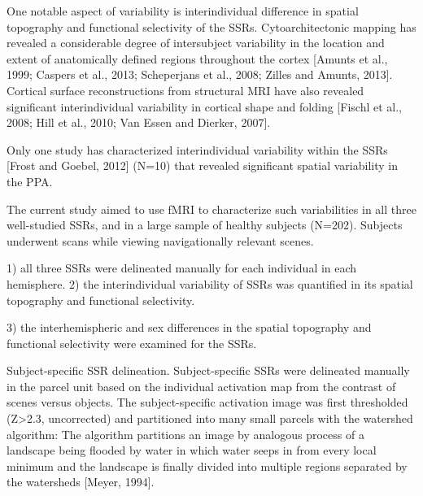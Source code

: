 %
One notable aspect of variability is interindividual difference in spatial
topography and functional selectivity of the SSRs.
%
Cytoarchitectonic mapping has revealed a considerable degree of intersubject
variability in the location and extent of anatomically defined regions
throughout the cortex [Amunts et al., 1999; Caspers et al., 2013; Scheperjans et
al., 2008; Zilles and Amunts, 2013].
%
Cortical surface reconstructions from structural MRI have also revealed
significant interindividual variability in cortical shape and folding [Fischl et
al., 2008; Hill et al., 2010; Van Essen and Dierker, 2007].

%
Only one study has characterized interindividual variability within the SSRs
[Frost and Goebel, 2012] (N=10) that revealed significant spatial variability in
the PPA.

The current study aimed to use fMRI to characterize such variabilities in all
three well-studied SSRs, and in a large sample of healthy subjects (N=202).
%
Subjects underwent scans while viewing navigationally relevant scenes.

%
1) all three SSRs were delineated manually for each individual in each
hemisphere.
%
2) the interindividual variability of SSRs was quantified in its spatial
topography and functional selectivity.

3) the interhemispheric and sex differences in the spatial topography and
functional selectivity were examined for the SSRs.

Subject-specific SSR delineation.
%
Subject-specific SSRs were delineated manually in the parcel unit based on the
individual activation map from the contrast of scenes versus objects.
%
The subject-specific activation image was first thresholded (Z>2.3, uncorrected)
and partitioned into many small parcels with the watershed algorithm:
%
The algorithm partitions an image by analogous process of a landscape being
flooded by water in which water seeps in from every local minimum and the
landscape is finally divided into multiple regions separated by the watersheds
[Meyer, 1994].

